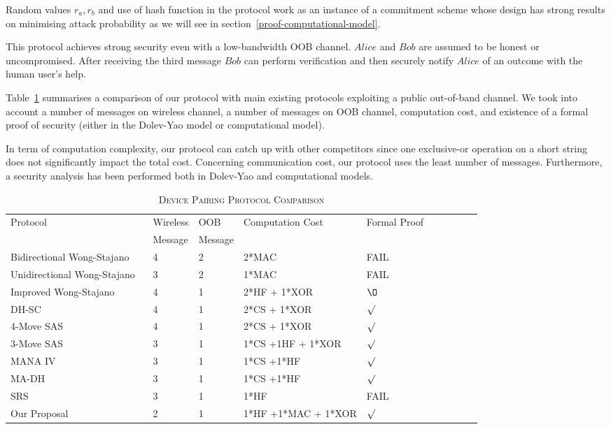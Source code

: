 Random values $r_a, r_b$ and use of hash function in the protocol work as an instance of a commitment scheme whose design has strong results on minimising attack probability as we will see in section~\ref{proof-computational-model}. 

This protocol achieves strong security even with a low-bandwidth OOB channel. $Alice$ and $Bob$ are assumed to be honest or uncompromised. After receiving the third message $Bob$ can perform verification and then securely notify $Alice$ of an outcome with the human user's help. 

Table~\ref{devcom} summarises a comparison of our protocol with main existing protocols exploiting a public out-of-band channel. We took into account a number of messages on wireless channel, a number of messages on OOB channel, computation cost, and existence of a formal proof of security (either in the Dolev-Yao model or computational model). 

In term of computation complexity, our protocol can catch up with other competitors since one exclusive-or operation on a short string does not significantly impact the total cost. Concerning communication cost, our protocol uses the least number of messages. Furthermore, a security 
analysis has been performed both in Dolev-Yao and computational models.

\begin{table}[ht] 
\centering
\caption{\textsc{Device Pairing Protocol Comparison}}
\label{devcom}
{\scriptsize
\begin{tabular}{ p{5cm} l l l l l p{1cm} l p{1cm} l }
\hline
Protocol & Wireless & OOB & Computation Cost & Formal Proof \\
  & Message & Message & & \\
\hline\hline
Bidirectional Wong-Stajano ~\cite{10.1109/MPRV.2007.76} & 4 & 2 & 2*MAC & FAIL \\ \hline
Unidirectional Wong-Stajano ~\cite{10.1109/MPRV.2007.76} & 3 & 2 & 1*MAC & FAIL \\ \hline
Improved Wong-Stajano ~\cite{Nguyen09authenticationprotocols} & 4 & 1 & 2*HF + 1*XOR & $\O$ \\ \hline
DH-SC ~\cite{1580514} & 4 & 1 & 2*CS + 1*XOR & $\surd$ \\ \hline
4-Move SAS ~\cite{Vaudenay:2005qa} & 4 & 1 & 2*CS + 1*XOR & $\surd$ \\ \hline
3-Move SAS ~\cite{Vaudenay:2005qa} & 3 & 1 & 1*CS +1HF + 1*XOR & $\surd$ \\ \hline
MANA IV ~\cite{Laur:2006kl} & 3 & 1 & 1*CS +1*HF & $\surd$ \\ \hline
MA-DH ~\cite{Laur:2006kl} & 3 & 1 & 1*CS +1*HF & $\surd$ \\ \hline
SRS~\cite{5678019} &3 & 1 & 1*HF &FAIL \\ \hline 
Our Proposal & 2 & 1 & 1*HF +1*MAC + 1*XOR & $\surd$ \\ \hline
\end{tabular}
}
\end{table}

